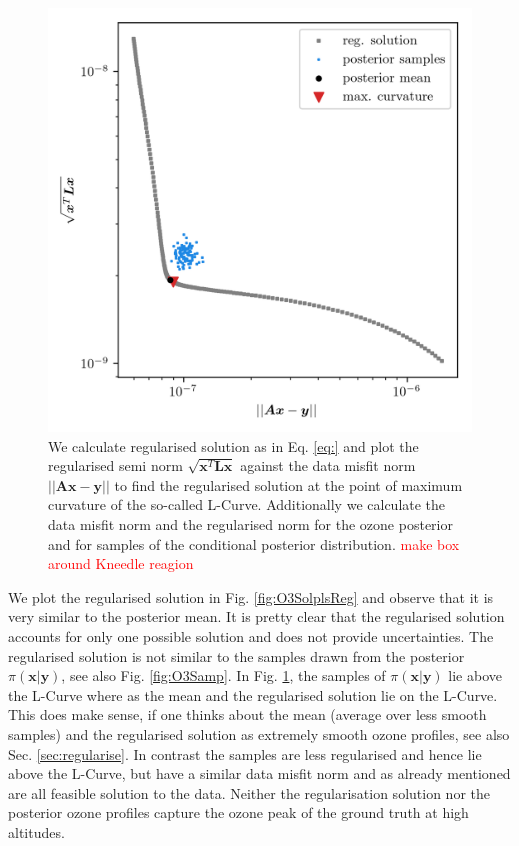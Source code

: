 \begin{figure}[ht!]
	\centering
	\includegraphics{LCurvePhD.png}
	\caption[Plot of the L-curve to find the regularised solution.]{We calculate regularised solution as in Eq. \ref{eq:} and plot the regularised semi norm $\sqrt{\bm{x}^T\bm{Lx}}$ against the data misfit norm $||\bm{Ax} -\bm{y} ||$ to find the regularised solution at the point of maximum curvature of the so-called L-Curve. Additionally we calculate the data misfit norm and the regularised norm for the ozone posterior and for samples of the conditional posterior distribution. \textcolor{red}{make box around Kneedle reagion}}
	\label{fig:LCurve}
\end{figure}

We plot the regularised solution in Fig. \ref{fig:O3SolplsReg} and observe that it is very similar to the posterior mean.
It is pretty clear that the regularised solution accounts for only one possible solution and does not provide uncertainties. The regularised solution is not similar to the samples drawn from the posterior $\pi(\bm{x}| \bm{y})$, see also Fig. \ref{fig:O3Samp}.
In Fig. \ref{fig:LCurve}, the samples of $\pi(\bm{x}| \bm{y})$ lie above the L-Curve where as the mean and the regularised solution lie on the L-Curve.
This does make sense, if one thinks about the mean (average over less smooth samples) and the regularised solution as extremely smooth ozone profiles, see also Sec. \ref{sec:regularise}.
In contrast the samples are less regularised and hence lie above the L-Curve, but have a similar data misfit norm and as already mentioned are all feasible solution to the data.
Neither the regularisation solution nor the posterior ozone profiles capture the ozone peak of the ground truth at high altitudes.

